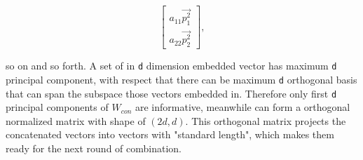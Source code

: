   \[\begin{bmatrix}
  a_{11}\vec{p^2_1}\\
  a_{22}\vec{p^2_2}
  \end{bmatrix},\]

  so on and so forth. A set of in \verb|d| dimension embedded vector has maximum \verb|d| principal component, with respect that there can be maximum \verb|d| orthogonal basis that can span the subspace those vectors embedded in. Therefore only first \verb|d| principal components of $W_{con}$ are informative, meanwhile can form a orthogonal normalized matrix with shape of $(2d, d)$. This orthogonal matrix projects the concatenated vectors into vectors with "standard length", which makes them ready for the next round of combination.

